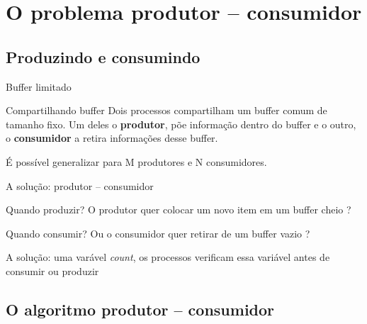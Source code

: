 \documentclass[11pt]{beamer}
\begin{document}
\section{O problema produtor -- consumidor}
\subsection*{Produzindo e consumindo}

\begin{frame}{Buffer limitado}
 
 \begin{block}{ Compartilhando buffer}
 Dois processos compartilham um buffer comum de tamanho fixo. 
 \pause
 Um deles o \textbf{produtor}, põe informação dentro do buffer e o outro,
 \pause
 o \textbf{consumidor} a retira informações desse buffer.
 \end{block}
 \pause
 É possível generalizar para M produtores e N consumidores.
\end{frame}


\begin{frame}{ A solução: produtor -- consumidor}

\begin{block}{ Quando produzir?}
 O produtor quer colocar um novo item em um buffer cheio ?
 \end{block}

 \pause
\begin{block}{ Quando consumir?}
 Ou o consumidor quer retirar de um buffer vazio ?
\end{block}

\pause
 A solução: uma varável \textit{count}, os processos verificam essa variável antes de consumir ou produzir
\end{frame}

\subsection*{O algoritmo produtor -- consumidor}
\end{document}
